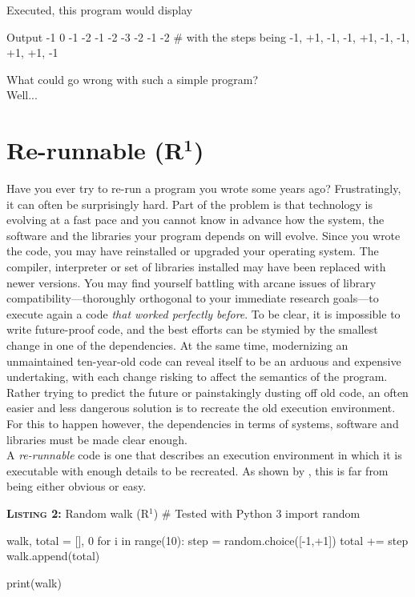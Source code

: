 \documentclass[a4paper,11pt]{article}
\begin{document}
Executed, this program would display
\begin{code}{Output}
-1  0 -1 -2 -1 -2 -3 -2 -1 -2 # with the steps being -1, +1, -1, -1, +1, -1, -1, +1, +1, -1
\end{code}

What could go wrong with such a simple program?\\
\vfill
Well...
\vfill

\clearpage
\section*{Re-runnable (R$^{\mathbf 1}$)}

Have you ever try to re-run a program you wrote some years ago? Frustratingly, it can often be surprisingly hard. Part of the problem is that technology is evolving at a fast pace and you cannot  know in advance how the system, the software and the libraries your program depends on will evolve. Since you wrote the code, you may have reinstalled or upgraded  your operating system. The compiler, interpreter or set of libraries installed may have been replaced with newer versions. You may find yourself battling with arcane issues of library compatibility---thoroughly orthogonal to your immediate research  goals---to execute again a code \emph{that worked perfectly before}. To be clear, it is impossible to write future-proof code, and the best efforts can be stymied by the smallest change in one of the dependencies. At the same time, modernizing an unmaintained ten-year-old code can reveal itself to be an arduous and expensive undertaking, with each change risking to affect the semantics of the program. Rather trying to predict the future or painstakingly dusting off old code, an often easier and less dangerous solution is to recreate the old execution environment. For this to happen however, the dependencies in terms of systems, software and libraries must be made clear enough.\\

A \emph{re-runnable} code is one that describes an execution environment in which it is executable with enough details to be recreated. As shown by \citep{Collberg:2016}, this is far from being either obvious or easy.\\

\noindent \begin{minipage}[c]{\linewidth}
\begin{code}{\textbf{\textsc{Listing 2:}} Random walk (R$^1$)}
# Tested with Python 3
import random

walk, total = [], 0
for i in range(10):
    step = random.choice([-1,+1])     
    total += step
    walk.append(total)
    
print(walk)
\end{code}
\end{minipage}\\
\end{document}
